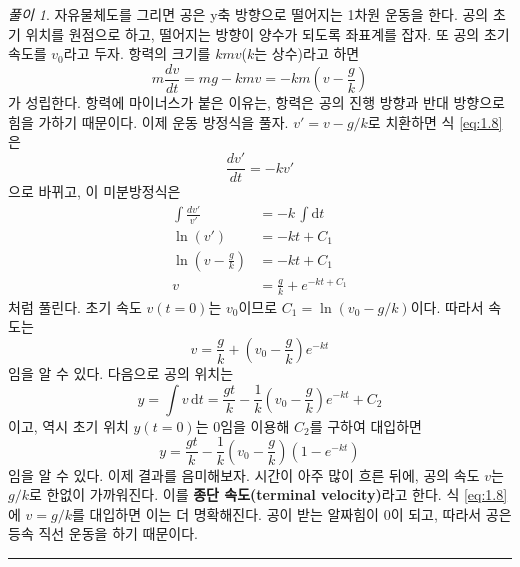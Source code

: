 \documentclass[chapter, oneside, b5paper]{oblivoir}
\theoremstyle{plain}
\theoremstyle{definition}
\theoremstyle{remark}
\newtheorem*{solution}{풀이}
\begin{document}
\begin{solution}
    자유물체도를 그리면 공은 y축 방향으로 떨어지는 1차원 운동을 한다. 공의 초기 위치를 원점으로 하고, 떨어지는 방향이 양수가 되도록 좌표계를 잡자. 또 공의 초기 속도를 $v_0$라고 두자. 항력의 크기를 $kmv$($k$는 상수)라고 하면
    \begin{equation}
        m\frac{dv}{dt} = mg - kmv = -km(v-\frac{g}{k}) \label{eq:1.8}
    \end{equation}
    가 성립한다. 항력에 마이너스가 붙은 이유는, 항력은 공의 진행 방향과 반대 방향으로 힘을 가하기 때문이다. 이제 운동 방정식을 풀자. $v'=v-g/k$로 치환하면 식 \ref{eq:1.8}은
    \begin{equation}
        \frac{dv'}{dt} = -kv' \label{eq:1.9}
    \end{equation}
    으로 바뀌고, 이 미분방정식은
    \begin{equation}
        \begin{aligned}
            \int\frac{dv'}{v'} &= -k \,\int \mathrm{d}t \\ \ln(v') &= -kt + C_1 \\ \ln(v-\frac{g}{k}) &= -kt+C_1 \\ v &=  \frac{g}{k} + e^{-kt+C_1}
        \end{aligned}
    \end{equation}
    처럼 풀린다. 초기 속도 $v(t=0)$는 $v_0$이므로 $C_1 = \ln(v_0-g/k)$이다. 따라서 속도는
    \begin{equation}
        v = \frac{g}{k} + (v_0-\frac{g}{k})e^{-kt} \label{eq:1.11}
    \end{equation}
    임을 알 수 있다. 다음으로 공의 위치는
    \begin{equation}
        y = \int v\, \mathrm{d}t = \frac{gt}{k} -\frac{1}{k}(v_0-\frac{g}{k})e^{-kt} + C_2 \label{eq:1.12}
    \end{equation}
    이고, 역시 초기 위치 $y(t=0)$는 0임을 이용해 $C_2$를 구하여 대입하면
    \begin{equation}
        y = \frac{gt}{k} -\frac{1}{k}(v_0-\frac{g}{k})(1-e^{-kt})\label{eq:1.13}
    \end{equation}
    임을 알 수 있다. 이제 결과를 음미해보자. 시간이 아주 많이 흐른 뒤에, 공의 속도 $v$는 $g/k$로 한없이 가까워진다. 이를 \textbf{종단 속도(terminal velocity)}라고 한다. 식 \ref{eq:1.8}에 $v=g/k$를 대입하면 이는 더 명확해진다. 공이 받는 알짜힘이 0이 되고, 따라서 공은 등속 직선 운동을 하기 때문이다.
\end{solution}

\noindent\rule{\textwidth}{0.8pt} %
\vspace{1em} %
\end{document}
